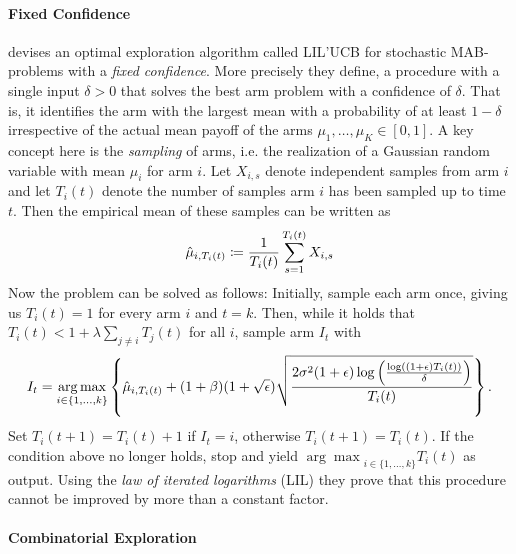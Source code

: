 \paragraph{Fixed Confidence}
\cite{jamieson2014lil} devises an optimal exploration algorithm called LIL'UCB for stochastic MAB-problems with a \textit{fixed confidence}. More precisely they define, a procedure with a single input $\delta > 0$ that solves the best arm problem with a confidence of $\delta$. That is, it identifies the arm with the largest mean with a probability of at least $1-\delta$ irrespective of the actual mean payoff of the arms $\mu_1,\ldots,\mu_K \in [0,1]$. A key concept here is the \textit{sampling} of arms, i.e. the realization of a Gaussian random variable with mean $\mu_i$ for arm $i$. Let $X_{i,s}$ denote independent samples from arm $i$ and let $T_i(t)$ denote the number of samples arm $i$ has been sampled up to time $t$. Then the empirical mean of these samples can be written as
\begin{equation*}
    \Hat{\mu}_{i,T_i(t)} \coloneqq \frac{1}{T_i(t)}\sum_{s=1}^{T_i(t)} X_{i,s}
\end{equation*}
Now the problem can be solved as follows: Initially, sample each arm once, giving us $T_i(t) = 1$ for every arm $i$ and $t = k$. Then, while it holds that $T_i(t) < 1 + \lambda \sum_{j\neq i} T_j(t)$ for all $i$, sample arm $I_t$ with
\begin{equation*}
    I_t = \underset{i \in \{1,\ldots,k\}}{\arg \max} \left\{ \Hat{\mu}_{i,T_i(t)} + (1+\beta)(1+\sqrt{\epsilon}) \sqrt{\frac{2\sigma^2 (1+\epsilon) \log \left(\frac{\log((1+\epsilon)T_i(t))}{\delta}\right)}{T_i(t)}}\right\}\text{.}
\end{equation*}
Set $T_i(t+1) = T_i(t) + 1$ if $I_t = i$, otherwise $T_i(t+1) = T_i(t)$. If the condition above no longer holds, stop and yield ${\arg \max}_{i \in \{ 1,\ldots,k\}} T_i(t)$ as output. Using the \textit{law of iterated logarithms} (LIL) they prove that this procedure cannot be improved by more than a constant factor.  
\paragraph{Combinatorial Exploration} \cite{chen2014combinatorial}
